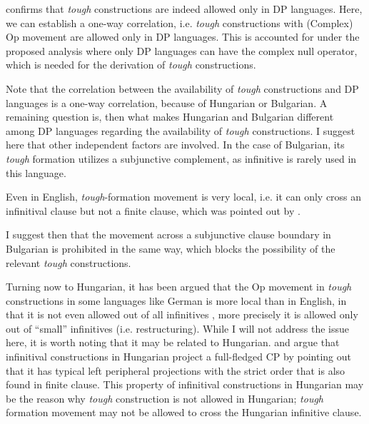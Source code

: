 \documentclass[output=paper,colorlinks,citecolor=brown,
]{langscibook}
\begin{document}
 confirms that \textit{tough} constructions are indeed allowed only in DP languages. Here, we can establish a one-way correlation, i.e. \textit{tough} constructions with (Complex) Op movement are allowed only in DP languages. This is accounted for under the proposed analysis where only DP languages can have the complex null operator, which is needed for the derivation of \textit{tough} constructions.

Note that the correlation between the availability of \textit{tough} constructions and DP languages is a one-way correlation, because of Hungarian or Bulgarian. A remaining question is, then what makes Hungarian and Bulgarian different among DP languages regarding the availability of \textit{tough} constructions. I suggest here that other independent factors are involved. In the case of Bulgarian, its \textit{tough} formation utilizes a subjunctive complement, as infinitive is rarely used in this language. 

Even in English, \textit{tough}-formation movement is very local, i.e. it can only cross an infinitival clause but not a finite clause, which was pointed out by \citet{Stowell1986}. 

\begin{exe}
\ex \label{36ha}
\begin{xlist}
\end{xlist}
\end{exe}

I suggest then that the movement across a subjunctive clause boundary in Bulgarian is prohibited in the same way, which blocks the possibility of the relevant \textit{tough} constructions.

Turning now to Hungarian, it has been argued that the Op movement in \textit{tough} constructions in some languages like German is more local than in English, in that it is not even allowed out of all infinitives \citep{Wurmbrand2001,Kayne1989,Roberts1997}, more precisely it is allowed only out of “small” infinitives (i.e. restructuring). While I will not address the issue here, it is worth noting that it may be related to Hungarian. \citet{Kenesei2005} and \citet{Dalmi2004} argue that infinitival constructions in Hungarian project a full-fledged CP by pointing out that it has typical left peripheral projections with the strict order that is also found in finite clause. This property of infinitival constructions in Hungarian may be the reason why \textit{tough} construction is not allowed in Hungarian; \textit{tough} formation movement may not be allowed to cross the Hungarian infinitive clause.
\end{document}

